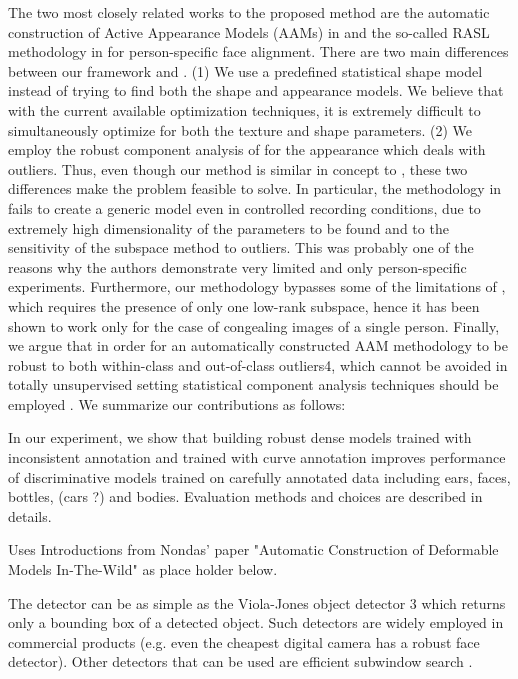 The two most closely related works to the proposed
method are the automatic construction of Active Appearance
Models (AAMs) in \cite{?} and the so-called RASL
methodology in \cite{?} for person-specific face alignment.
There are two main differences between our framework
and \cite{?}. (1) We use a predefined statistical shape model
instead of trying to find both the shape and appearance models.
We believe that with the current available optimization
techniques, it is extremely difficult to simultaneously optimize
for both the texture and shape parameters. (2) We
employ the robust component analysis of \cite{?} for the appearance
which deals with outliers. Thus, even though
our method is similar in concept to \cite{?}, these two differences
make the problem feasible to solve. In particular, the
methodology in \cite{?} fails to create a generic model even in
controlled recording conditions, due to extremely high dimensionality
of the parameters to be found and to the sensitivity
of the subspace method to outliers. This was probably
one of the reasons why the authors demonstrate very
limited and only person-specific experiments. Furthermore,
our methodology bypasses some of the limitations of \cite{?},
which requires the presence of only one low-rank subspace,
hence it has been shown to work only for the case of congealing
images of a single person. Finally, we argue that
in order for an automatically constructed AAM methodology
to be robust to both within-class and out-of-class outliers4,
which cannot be avoided in totally unsupervised setting
statistical component analysis techniques should be
employed \cite{?}. We summarize our contributions as follows:


In our experiment, we show that building robust dense models trained with inconsistent annotation and trained with curve annotation improves performance of discriminative models trained on carefully annotated data including ears, faces, bottles, (cars ?) and bodies. Evaluation methods and choices are described in details.

Uses Introductions from Nondas' paper "Automatic Construction of Deformable Models In-The-Wild" as place holder below.


The detector can be as
simple as the Viola-Jones object detector \cite{?}
3 which returns
only a bounding box of a detected object. Such detectors
are widely employed in commercial products (e.g.
even the cheapest digital camera has a robust face detector).
Other detectors that can be used are efficient subwindow
search \cite{?}. 


